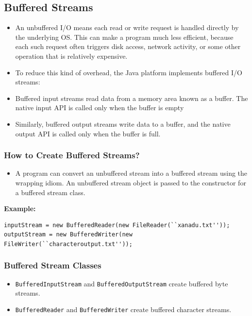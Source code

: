 \documentclass[11pt,a4paper]{article}
\begin{document}
\subsection*{Buffered Streams}
\begin{itemize}
    \item An unbuffered I/O means each read or write request is handled directly by the underlying OS. This can make a program much less efficient, because each such request often triggers disk access, network activity, or some other operation that is relatively expensive.
\item To reduce this kind of overhead, the Java platform implements buffered I/O streams:
\item Buffered input streams read data from a memory area known as a buffer. The native input API is called only when the buffer is empty
\item Similarly, buffered output streams write data to a buffer, and the native output API is called only when the buffer is full. 
\end{itemize}


\subsubsection*{How to Create Buffered Streams?}
\begin{itemize}
    \item A program can convert an unbuffered stream into a buffered stream using the wrapping idiom. An unbuffered stream object is passed to the constructor for a buffered stream class.
    \end{itemize} 
\textbf{Example:} 
\begin{lstlisting}[numbers=none]
inputStream = new BufferedReader(new FileReader(``xanadu.txt'')); 
outputStream = new BufferedWriter(new 
FileWriter(``characteroutput.txt'')); 
\end{lstlisting}


\subsubsection*{Buffered Stream Classes}
\begin{itemize}
    \item \texttt{BufferedInputStream} and \texttt{BufferedOutputStream} create buffered byte streams. 
    \item \texttt{BufferedReader} and \texttt{BufferedWriter} create buffered character streams. 
\end{itemize}
\end{document}
